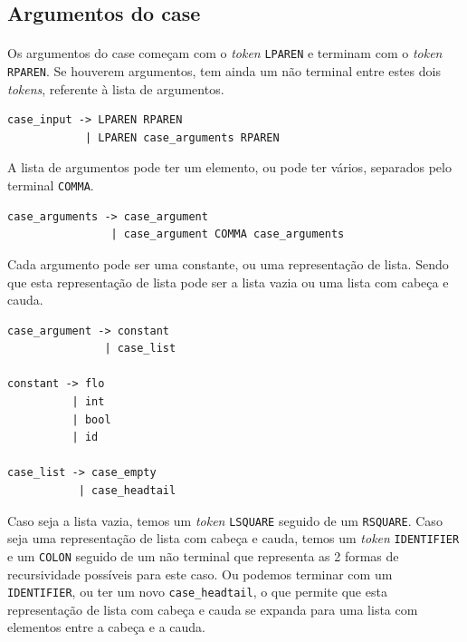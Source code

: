 \documentclass[11pt,a4paper]{report}
\begin{document}
\subsection{Argumentos do case}
\paragraph*{}
Os argumentos do case começam com o \textit{token} \texttt{LPAREN} e terminam com o \textit{token} \texttt{RPAREN}. Se houverem argumentos, tem ainda um não terminal entre estes dois \textit{tokens}, referente à lista de argumentos.

\begin{verbatim}
case_input -> LPAREN RPAREN
            | LPAREN case_arguments RPAREN
\end{verbatim}

A lista de argumentos pode ter um elemento, ou pode ter vários, separados pelo terminal \texttt{COMMA}.

\begin{verbatim}
case_arguments -> case_argument
                | case_argument COMMA case_arguments
\end{verbatim}

Cada argumento pode ser uma constante, ou uma representação de lista. Sendo que esta representação de lista pode ser a lista vazia ou uma lista com cabeça e cauda.

\begin{verbatim}
case_argument -> constant
               | case_list

constant -> flo
          | int
          | bool
          | id

case_list -> case_empty
           | case_headtail
\end{verbatim}

Caso seja a lista vazia, temos um \textit{token} \texttt{LSQUARE} seguido de um \texttt{RSQUARE}. Caso seja uma representação de lista com cabeça e cauda, temos um \textit{token} \texttt{IDENTIFIER} e um \texttt{COLON} seguido de um não terminal que representa as 2 formas de recursividade possíveis para este caso. Ou podemos terminar com um \texttt{IDENTIFIER}, ou ter um novo \texttt{case_headtail}, o que permite que esta representação de lista com cabeça e cauda se expanda para uma lista com elementos entre a cabeça e a cauda.
\end{document}
